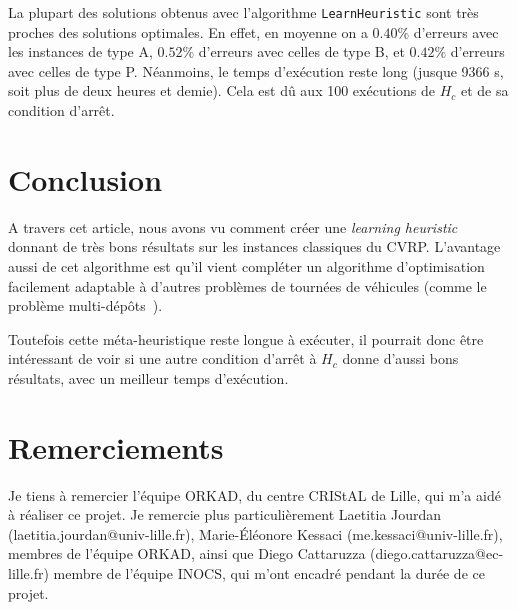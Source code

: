 \documentclass[a4paper,11pt]{article}%
\begin{document}
La plupart des solutions obtenus avec l'algorithme \lstinline|LearnHeuristic| sont très proches des solutions optimales.
En effet, en moyenne on a $0.40\%$ d'erreurs avec les instances de type A, $0.52\%$ d'erreurs avec celles de type B, et $0.42\%$ d'erreurs avec celles de type P.
Néanmoins, le temps d'exécution reste long (jusque 9366 s, soit plus de deux heures et demie). Cela est dû aux 100 exécutions de $H_c$ et de sa condition d'arrêt.  

\section*{Conclusion}
A travers cet article, nous avons vu comment créer une \emph{learning heuristic} donnant de très bons résultats sur les instances classiques du CVRP.
L'avantage aussi de cet algorithme est qu'il vient compléter un algorithme d'optimisation facilement adaptable à d'autres problèmes de tournées de véhicules (comme le problème multi-dépôts~\cite{Sorensen_2017}).
 
Toutefois cette méta-heuristique reste longue à exécuter, il pourrait donc être intéressant de voir si une autre condition d'arrêt à $H_c$ donne d'aussi bons résultats, avec un meilleur temps d'exécution.


\section*{Remerciements}
Je tiens à remercier l'équipe ORKAD, du centre CRIStAL de Lille, qui m'a aidé à réaliser ce projet. Je remercie plus particulièrement Laetitia Jourdan (laetitia.jourdan@univ-lille.fr), Marie-Éléonore Kessaci (me.kessaci@univ-lille.fr), membres de l'équipe ORKAD, ainsi que Diego Cattaruzza (diego.cattaruzza@ec-lille.fr) membre de l'équipe INOCS, qui m'ont encadré pendant la durée de ce projet.





\end{document}
